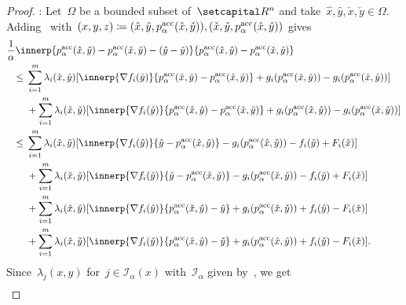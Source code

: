 \documentclass[../main]{subfiles}
\begin{document}
\begin{proof}
    :
    Let~$\Omega$ be a bounded subset of~$\setR^n$ and take~$\hat{x}, \hat{y}, \check{x}, \check{y} \in \Omega$.
    Adding~ with~$(x, y, z) \coloneqq (\hat{x}, \hat{y}, p^{\mathrm{acc}}_\alpha(\check{x}, \check{y})), (\check{x}, \check{y}, p^{\mathrm{acc}}_\alpha(\hat{x}, \hat{y}))$ gives
    \begin{align}
        \MoveEqLeft \frac{1}{\alpha} \innerp{p^\acc_\alpha(\hat{x}, \hat{y}) - p^\acc_\alpha(\check{x}, \check{y}) - (\hat{y} - \check{y})}{p^\acc_\alpha(\hat{x}, \hat{y}) - p^\acc_\alpha(\check{x}, \check{y})}                                           \\
        \le{} & \sum_{i = 1}^{m} \lambda_i(\hat{x}, \hat{y}) [\innerp{\nabla f_i(\hat{y})}{p^\acc_\alpha(\check{x}, \check{y}) - p^\acc_\alpha(\hat{x}, \hat{y})} + g_i(p^\acc_\alpha(\check{x}, \check{y})) - g_i(p^\acc_\alpha(\hat{x}, \hat{y}))]         \\
              & + \sum_{i = 1}^{m} \lambda_i(\check{x}, \check{y}) [\innerp{\nabla f_i(\check{y})}{p^\acc_\alpha(\hat{x}, \hat{y}) - p^\acc_\alpha(\check{x}, \check{y})} + g_i(p^\acc_\alpha(\hat{x}, \hat{y})) - g_i(p^\acc_\alpha(\check{x}, \check{y}))] \\
        \le{} & \sum_{i = 1}^{m} \lambda_i(\hat{x}, \hat{y}) [\innerp{\nabla f_i(\hat{y})}{\hat{y} - p^\acc_\alpha(\hat{x}, \hat{y})} - g_i(p^\acc_\alpha(\hat{x}, \hat{y})) - f_i(\hat{y}) + F_i(\hat{x})]                                                  \\
              & + \sum_{i = 1}^{m} \lambda_i(\check{x}, \check{y}) [\innerp{\nabla f_i(\check{y})}{\check{y} - p^\acc_\alpha(\check{x}, \check{y})} - g_i(p^\acc_\alpha(\check{x}, \check{y})) - f_i(\check{y}) + F_i(\check{x})]                            \\
              & + \sum_{i = 1}^{m} \lambda_i(\hat{x}, \hat{y}) [\innerp{\nabla f_i(\hat{y})}{p^\acc_\alpha(\check{x}, \check{y}) - \hat{y}} + g_i(p^\acc_\alpha(\check{x}, \check{y})) + f_i(\hat{y}) - F_i(\hat{x})]                                        \\
              & + \sum_{i = 1}^{m} \lambda_i(\check{x}, \check{y}) [\innerp{\nabla f_i(\check{y})}{p^\acc_\alpha(\hat{x}, \hat{y}) - \check{y}} + g_i(p^\acc_\alpha(\hat{x}, \hat{y})) + f_i(\check{y}) - F_i(\check{x})]
        .\end{align}
    Since~$\lambda_j(x, y)$ for~$j \in \mathcal{I}_\alpha(x)$ with~$\mathcal{I}_\alpha$ given by~, we get
    \begin{align}

\end{align}
\end{proof}
\end{document}
